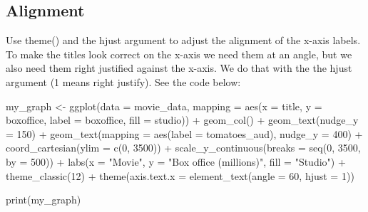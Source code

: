 \documentclass[
]{krantz}
\makeatletter
\newenvironment{Shaded}{\begin{snugshade}}{\end{snugshade}}
\newcommand{\AttributeTok}[1]{\textcolor[rgb]{0.61,0.61,0.61}{#1}}
\newcommand{\DecValTok}[1]{\textcolor[rgb]{0.06,0.06,0.06}{#1}}
\newcommand{\FunctionTok}[1]{\textcolor[rgb]{0,0,0}{#1}}
\newcommand{\NormalTok}[1]{#1}
\newcommand{\OtherTok}[1]{\textcolor[rgb]{0.37,0.37,0.37}{#1}}
\newcommand{\SpecialCharTok}[1]{\textcolor[rgb]{0,0,0}{#1}}
\newcommand{\StringTok}[1]{\textcolor[rgb]{0.5,0.5,0.5}{#1}}
\newenvironment{kframe}{%
\medskip{}
\setlength{\fboxsep}{.8em}
 \def\at@end@of@kframe{}%
 \ifinner\ifhmode%
  \def\at@end@of@kframe{\end{minipage}}%
  \begin{minipage}{\columnwidth}%
 \fi\fi%
 \def\FrameCommand##1{\hskip\@totalleftmargin \hskip-\fboxsep
 \colorbox{shadecolor}{##1}\hskip-\fboxsep
     \hskip-\linewidth \hskip-\@totalleftmargin \hskip\columnwidth}%
 \MakeFramed {\advance\hsize-\width
   \@totalleftmargin\z@ \linewidth\hsize
   \@setminipage}}%
 {\par\unskip\endMakeFramed%
 \at@end@of@kframe}
\renewenvironment{Shaded}{\begin{kframe}}{\end{kframe}}
\makeatother
\begin{document}
\hypertarget{alignment}{%
\subsection{Alignment}\label{alignment}}

Use theme() and the hjust argument to adjust the alignment of the x-axis labels. To make the titles look correct on the x-axis we need them at an angle, but we also need them right justified against the x-axis. We do that with the the hjust argument (1 means right justify). See the code below:

\begin{Shaded}
\begin{Highlighting}[]
\NormalTok{my\_graph }\OtherTok{\textless{}{-}} \FunctionTok{ggplot}\NormalTok{(}\AttributeTok{data =}\NormalTok{ movie\_data,}
           \AttributeTok{mapping =} \FunctionTok{aes}\NormalTok{(}\AttributeTok{x =}\NormalTok{ title,}
                         \AttributeTok{y =}\NormalTok{ boxoffice,}
                         \AttributeTok{label =}\NormalTok{ boxoffice, }
                         \AttributeTok{fill =}\NormalTok{ studio)) }\SpecialCharTok{+}
  \FunctionTok{geom\_col}\NormalTok{() }\SpecialCharTok{+}
  \FunctionTok{geom\_text}\NormalTok{(}\AttributeTok{nudge\_y =} \DecValTok{150}\NormalTok{)  }\SpecialCharTok{+}
  \FunctionTok{geom\_text}\NormalTok{(}\AttributeTok{mapping =} \FunctionTok{aes}\NormalTok{(}\AttributeTok{label =}\NormalTok{ tomatoes\_aud), }
            \AttributeTok{nudge\_y =} \DecValTok{400}\NormalTok{) }\SpecialCharTok{+}
  \FunctionTok{coord\_cartesian}\NormalTok{(}\AttributeTok{ylim =} \FunctionTok{c}\NormalTok{(}\DecValTok{0}\NormalTok{, }\DecValTok{3500}\NormalTok{)) }\SpecialCharTok{+}
  \FunctionTok{scale\_y\_continuous}\NormalTok{(}\AttributeTok{breaks =} \FunctionTok{seq}\NormalTok{(}\DecValTok{0}\NormalTok{, }\DecValTok{3500}\NormalTok{, }\AttributeTok{by =} \DecValTok{500}\NormalTok{)) }\SpecialCharTok{+}
  \FunctionTok{labs}\NormalTok{(}\AttributeTok{x =} \StringTok{"Movie"}\NormalTok{,}
       \AttributeTok{y =} \StringTok{"Box office (millions)"}\NormalTok{,}
       \AttributeTok{fill =} \StringTok{"Studio"}\NormalTok{) }\SpecialCharTok{+}
  \FunctionTok{theme\_classic}\NormalTok{(}\DecValTok{12}\NormalTok{) }\SpecialCharTok{+}
  \FunctionTok{theme}\NormalTok{(}\AttributeTok{axis.text.x =} \FunctionTok{element\_text}\NormalTok{(}\AttributeTok{angle =} \DecValTok{60}\NormalTok{, }
                                   \AttributeTok{hjust =} \DecValTok{1}\NormalTok{))  }

\FunctionTok{print}\NormalTok{(my\_graph)}
\end{Highlighting}
\end{Shaded}
\end{document}
